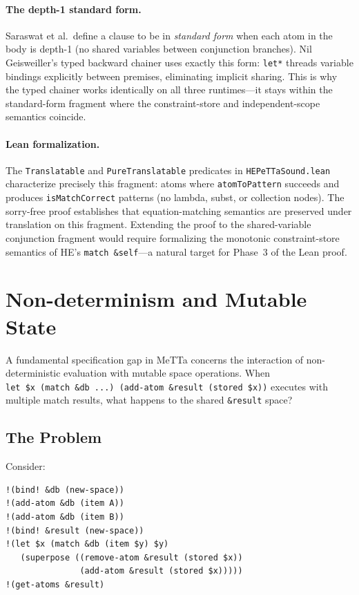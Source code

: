 \documentclass[11pt]{article}
\newcommand{\code}[1]{\texttt{#1}}
\newcommand{\HE}{\textup{HE}}
\begin{document}
\paragraph{The depth-1 standard form.}
Saraswat et al.\ define a clause to be in \emph{standard form} when
each atom in the body is depth-1 (no shared variables between
conjunction branches).  Nil Geisweiller's typed backward chainer
uses exactly this form: \code{let*} threads variable bindings
explicitly between premises, eliminating implicit sharing.  This is
why the typed chainer works identically on all three runtimes---it
stays within the standard-form fragment where the constraint-store
and independent-scope semantics coincide.

\paragraph{Lean formalization.}
The \code{Translatable} and \code{PureTranslatable} predicates in
\code{HEPeTTaSound.lean} characterize precisely this fragment: atoms
where \code{atomToPattern} succeeds and produces
\code{isMatchCorrect} patterns (no lambda, subst, or collection
nodes).  The sorry-free proof establishes that equation-matching
semantics are preserved under translation on this fragment.  Extending
the proof to the shared-variable conjunction fragment would require
formalizing the monotonic constraint-store semantics of \HE{}'s
\code{match~\&self}---a natural target for Phase~3 of the Lean proof.

\section{Non-determinism and Mutable State}
\label{sec:nondet-state}

A fundamental specification gap in MeTTa concerns the interaction of
non-deterministic evaluation with mutable space operations.  When
\code{let~\$x~(match~\&db~...)~(add-atom~\&result~(stored~\$x))}
executes with multiple match results, what happens to the shared
\code{\&result} space?

\subsection{The Problem}

Consider:
\begin{lstlisting}[language={},basicstyle=\ttfamily\scriptsize]
!(bind! &db (new-space))
!(add-atom &db (item A))
!(add-atom &db (item B))
!(bind! &result (new-space))
!(let $x (match &db (item $y) $y)
   (superpose ((remove-atom &result (stored $x))
               (add-atom &result (stored $x)))))
!(get-atoms &result)
\end{lstlisting}
\end{document}
